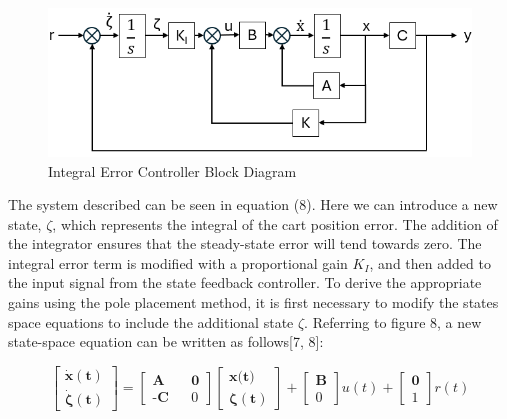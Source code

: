 \documentclass[titlepage]{article}
\begin{document}
\begin{figure}[h]
    \includegraphics[width=1\linewidth]{cory_controller.png}
    \caption{Integral Error Controller Block Diagram}
    \label{fig:enter-label}
\end{figure}

The system described can be seen in equation (8). Here we can introduce a new state, $\zeta$, which represents the integral of the cart position error. The addition of the integrator ensures that the steady-state error will tend towards zero. The integral error term is modified with a proportional gain $K_I$, and then added to the input signal from the state feedback controller. To derive the appropriate gains using the pole placement method, it is first necessary to modify the states space equations to include the additional state $\zeta$. Referring to figure 8, a new state-space equation can be written as follows[7, 8]:

\begin{equation}
    \begin{bmatrix}
        \mathbf{\dot x(t)} \\
        \boldsymbol{\dot \zeta(t)}
    \end{bmatrix}
    =
    \begin{bmatrix}
        \textbf{A} && \textbf{0} \\
        \textbf{-C} && 0
    \end{bmatrix}
    \begin{bmatrix}
        \textbf{x(t)} \\
        \boldsymbol{\zeta(t)}
    \end{bmatrix}
    +
    \begin{bmatrix}
        \textbf{B} \\ 0
    \end{bmatrix}
    u(t)
    +
    \begin{bmatrix}
        \textbf{0} \\ 1
    \end{bmatrix}
    r(t)
\end{equation}
\end{document}
